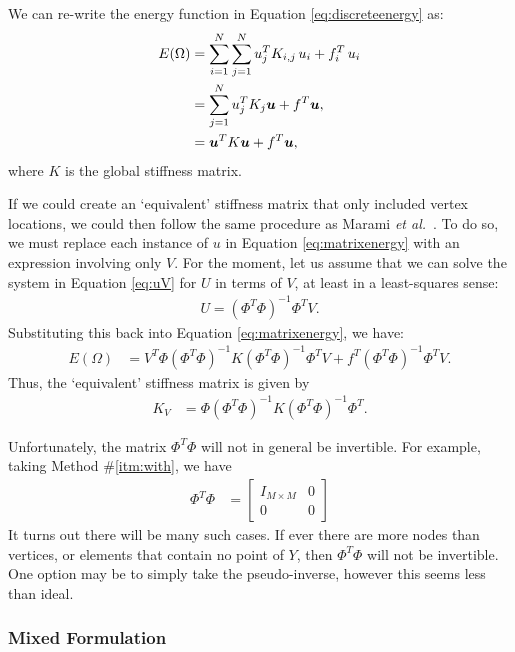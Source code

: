 \documentclass[10pt]{article}
\newcommand{\uvec}{\bm{u}}
\begin{document}
We can re-write the energy function in Equation \eqref{eq:discreteenergy} as:
\begin{align}
  E(\Omega) & = \sum_{i=1}^N\sum_{j=1}^N u_j^T K_{i,j}\, u_i + f_i^T\,u_i \notag\\
  & = \sum_{j=1}^N u_j^T K_j \uvec + f^T \uvec, \notag\\
  & = \uvec^TK\uvec + f^T\uvec, \label{eq:matrixenergy}
\end{align}
where $K$ is the global stiffness matrix.

If we could create an `equivalent' stiffness matrix that only included vertex locations, we could then follow the same procedure as Marami 
\textit{et al.}~\cite{marami:2011:femreg}. To do so, we must replace each instance of $u$ in Equation \eqref{eq:matrixenergy} with an 
expression involving only $V$.  For the moment, let us assume that we can solve the system in Equation \eqref{eq:uV} for $U$ in terms of 
$V$, at least in a least-squares sense:
\begin{align}
  U = (\Phi^T\Phi)^{-1}\Phi^T V.
\end{align}
Substituting this back into Equation \eqref{eq:matrixenergy}, we have:
\begin{align}
  E(\Omega) & = V^T\Phi(\Phi^T\Phi)^{-1} K (\Phi^T\Phi)^{-1}\Phi^T V + f^T (\Phi^T\Phi)^{-1}\Phi^T V.
\end{align}
Thus, the `equivalent' stiffness matrix is given by 
\begin{align}
  K_V & = \Phi(\Phi^T\Phi)^{-1} K (\Phi^T\Phi)^{-1}\Phi^T.
\end{align}

Unfortunately, the matrix $\Phi^T\Phi$ will not in general be invertible.  For example, taking Method \#\ref{itm:with}, we have
\begin{align}
  \Phi^T\Phi & = \begin{bmatrix}
                  I_{M\times M} & 0\\
                  0 & 0
                 \end{bmatrix}
\end{align}
It turns out there will be many such cases. If ever there are more nodes than vertices, or elements that contain no point of $Y$,
then $\Phi^T\Phi$ will not be invertible.  One option may be to simply take the pseudo-inverse, however this seems less than ideal.

\subsubsection{Mixed Formulation}
\end{document}
